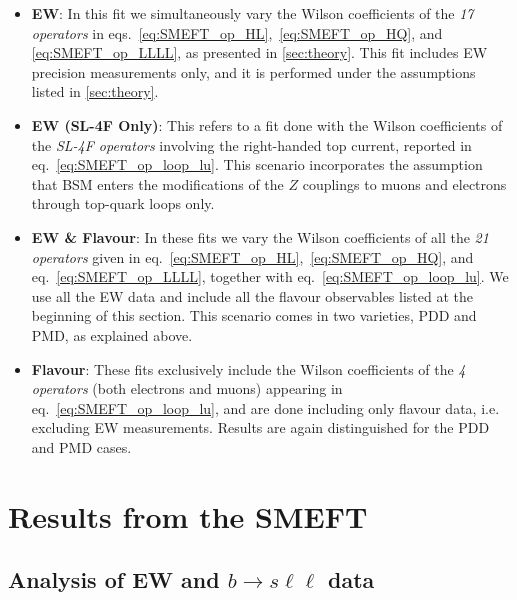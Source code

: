 \begin{itemize}
	\setlength\itemsep{0em}
	\item {\bf EW}:
	In this fit we simultaneously vary the Wilson coefficients of the {\it 17 operators} in eqs.~\eqref{eq:SMEFT_op_HL},~\eqref{eq:SMEFT_op_HQ}, and \eqref{eq:SMEFT_op_LLLL}, as presented in \autoref{sec:theory}. This fit includes EW precision measurements only, and it is performed under the assumptions listed in \autoref{sec:theory}.
	\item  {\bf EW (SL-4F Only)}: This refers to a fit done with the Wilson coefficients of the {\em SL-4F operators} involving the right-handed top current, reported in eq.~\eqref{eq:SMEFT_op_loop_lu}. This scenario incorporates the assumption that BSM enters the modifications of the $Z$ couplings to muons and electrons through top-quark loops only.
	\item {\bf EW \& Flavour}: In these fits we vary the Wilson coefficients of all the {\em 21 operators} given in eq.~\eqref{eq:SMEFT_op_HL},~\eqref{eq:SMEFT_op_HQ}, and eq.~\eqref{eq:SMEFT_op_LLLL}, together with eq.~\eqref{eq:SMEFT_op_loop_lu}.
	We use all the EW data and include all the flavour observables listed at the beginning of this section. This scenario comes in two varieties, PDD and PMD, as explained above.
	\item {\bf Flavour}: These fits exclusively include the Wilson coefficients of the {\em 4 operators} (both electrons and muons) appearing in eq.~\eqref{eq:SMEFT_op_loop_lu}, and are done including only flavour data, i.e. excluding EW measurements. Results are again distinguished for the PDD and PMD cases. 
\end{itemize}


\section{Results from the SMEFT}
\label{sec:EFT_results}

\subsection[Analysis of EW and \texorpdfstring{$b \to s \ell \ell$}{b to s ll} data]
{Analysis of EW and \boldmath$b \to s \ell \ell$ data}
\label{sec:GEN_EFT_results}

